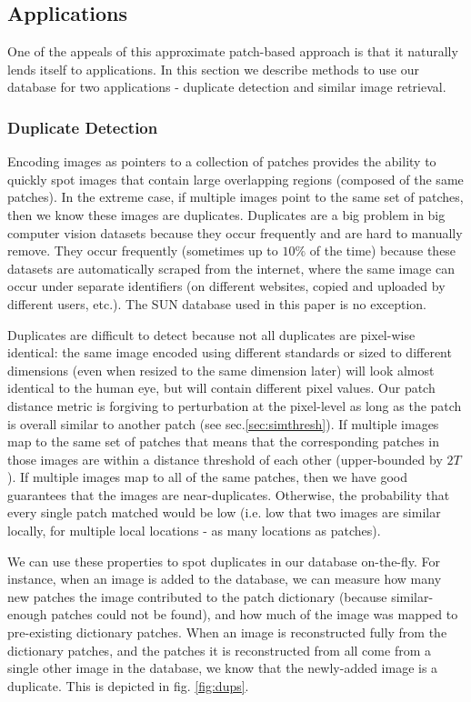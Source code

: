 \subsection{Applications}\label{sec:apps}

One of the appeals of this approximate patch-based approach
is that it naturally lends itself to applications. In this
section we describe methods to use our database for
two applications - duplicate detection and similar image retrieval.

\subsubsection{Duplicate Detection}\label{sec:dups}

Encoding images as pointers to a collection of patches provides the ability to quickly spot images that contain large overlapping regions (composed of the same patches). In the extreme case, if multiple images point to the same set of patches, then we know these images are duplicates. Duplicates are a big problem in big computer vision datasets because they occur frequently and are hard to manually remove. They occur frequently (sometimes up to $10\%$ of the time) because these datasets are automatically scraped from the internet, where the same image can occur under separate identifiers (on different websites, copied and uploaded by different users, etc.). The SUN database \cite{SUN} used in this paper is no exception.

Duplicates are difficult to detect because not all duplicates are pixel-wise identical: the same image encoded using different standards or sized to different dimensions (even when resized to the same dimension later) will look almost identical to the human eye, but will contain different pixel values. Our patch distance metric is forgiving to perturbation at the pixel-level as long as the patch is overall similar to another patch (see sec.\ref{sec:simthresh}). If multiple images map to the same set of patches that means that the corresponding patches in those images are within a distance threshold of each other (upper-bounded by $2T$). If multiple images map to all of the same patches, then we have good guarantees that the images are near-duplicates. Otherwise, the probability that every single patch matched would be low (i.e. low that two images are similar locally, for multiple local locations - as many locations as patches).

We can use these properties to spot duplicates in our database on-the-fly. For instance, when an image is added to the database, we can measure how many new patches the image contributed to the patch dictionary (because similar-enough patches could not be found), and how much of the image was mapped to pre-existing dictionary patches. When an image is reconstructed fully from the dictionary patches, and the patches it is reconstructed from all come from a single other image in the database, we know that the newly-added image is a duplicate. This is depicted in fig. \ref{fig:dups}.

